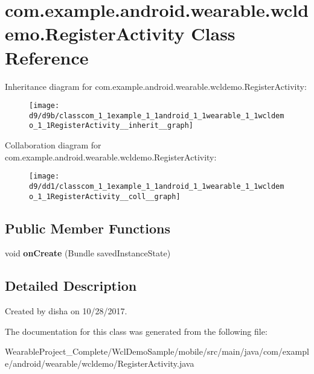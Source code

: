 \hypertarget{classcom_1_1example_1_1android_1_1wearable_1_1wcldemo_1_1RegisterActivity}{}\section{com.\+example.\+android.\+wearable.\+wcldemo.\+Register\+Activity Class Reference}
\label{classcom_1_1example_1_1android_1_1wearable_1_1wcldemo_1_1RegisterActivity}


Inheritance diagram for com.\+example.\+android.\+wearable.\+wcldemo.\+Register\+Activity\+:\nopagebreak
\begin{figure}[H]
\begin{center}
\leavevmode
\texttt{[image: d9/d9b/classcom\_1\_1example\_1\_1android\_1\_1wearable\_1\_1wcldemo\_1\_1RegisterActivity\_\_inherit\_\_graph]}
\end{center}
\end{figure}


Collaboration diagram for com.\+example.\+android.\+wearable.\+wcldemo.\+Register\+Activity\+:\nopagebreak
\begin{figure}[H]
\begin{center}
\leavevmode
\texttt{[image: d9/dd1/classcom\_1\_1example\_1\_1android\_1\_1wearable\_1\_1wcldemo\_1\_1RegisterActivity\_\_coll\_\_graph]}
\end{center}
\end{figure}
\subsection*{Public Member Functions}
\begin{DoxyCompactItemize}
\item 
void {\bfseries on\+Create} (Bundle saved\+Instance\+State)\hypertarget{classcom_1_1example_1_1android_1_1wearable_1_1wcldemo_1_1RegisterActivity_a97570cea5b0a43d7c1ae2bc29afba697}{}\label{classcom_1_1example_1_1android_1_1wearable_1_1wcldemo_1_1RegisterActivity_a97570cea5b0a43d7c1ae2bc29afba697}

\end{DoxyCompactItemize}


\subsection{Detailed Description}
Created by disha on 10/28/2017. 

The documentation for this class was generated from the following file\+:\begin{DoxyCompactItemize}
\item 
Wearable\+Project\+\_\+\+Complete/\+Wcl\+Demo\+Sample/mobile/src/main/java/com/example/android/wearable/wcldemo/Register\+Activity.\+java\end{DoxyCompactItemize}
